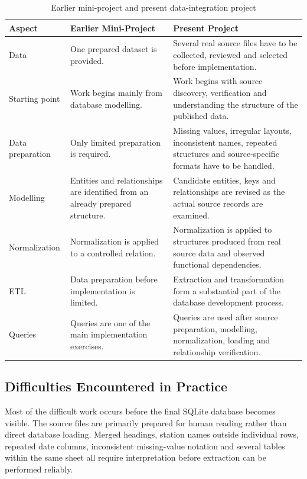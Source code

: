 \begin{table}[H]
\centering
\caption{Earlier mini-project and present data-integration project}
\label{tab:mini-present-project}
\setlength{\tabcolsep}{6pt}
\renewcommand{\arraystretch}{1.22}
\begin{tabular}{p{3.2cm}p{4.6cm}p{6.0cm}}
\toprule
\textbf{Aspect} & \textbf{Earlier Mini-Project} & \textbf{Present Project} \\
\midrule
Data & One prepared dataset is provided. & Several real source files have to be
collected, reviewed and selected before implementation. \\
Starting point & Work begins mainly from database modelling. & Work begins with
source discovery, verification and understanding the structure of the
published data. \\
Data preparation & Only limited preparation is required. & Missing values,
irregular layouts, inconsistent names, repeated structures and source-specific
formats have to be handled. \\
Modelling & Entities and relationships are identified from an already prepared
structure. & Candidate entities, keys and relationships are revised as the
actual source records are examined. \\
Normalization & Normalization is applied to a controlled relation. &
Normalization is applied to structures produced from real source data and
observed functional dependencies. \\
ETL & Data preparation before implementation is limited. & Extraction and
transformation form a substantial part of the database development process. \\
Queries & Queries are one of the main implementation exercises. & Queries are
used after source preparation, modelling, normalization, loading and
relationship verification. \\
\bottomrule
\end{tabular}
\end{table}

\subsection{Difficulties Encountered in Practice}
\label{subsec:practical-difficulties}

Most of the difficult work occurs before the final SQLite database becomes
visible. The source files are primarily prepared for human reading rather than
direct database loading. Merged headings, station names outside individual
rows, repeated date columns, inconsistent missing-value notation and several
tables within the same sheet all require interpretation before extraction can
be performed reliably.

